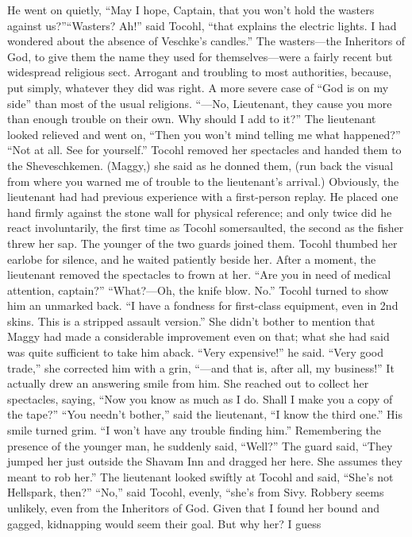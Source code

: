 \documentclass[9pt]{article}
\begin{document}
He went on quietly, “May I hope, Captain, that you won’t hold the wasters against us?”“Wasters? Ah!” said Tocohl, “that explains the electric lights. I had wondered about the absence of
Veschke’s candles.” The wasters—the Inheritors of God, to give them the name they used for
themselves—were a fairly recent but widespread religious sect. Arrogant and troubling to most
authorities, because, put simply, whatever they did was right. A more severe case of “God is on my side”
than most of the usual religions. “—No, Lieutenant, they cause you more than enough trouble on their
own. Why should I add to it?”
The lieutenant looked relieved and went on, “Then you won’t mind telling me what happened?”
“Not at all. See for yourself.” Tocohl removed her spectacles and handed them to the
Sheveschkemen. (Maggy,) she said as he donned them, (run back the visual from where you warned me
of trouble to the lieutenant’s arrival.)
Obviously, the lieutenant had had previous experience with a first-person replay. He placed one hand
firmly against the stone wall for physical reference; and only twice did he react involuntarily, the first time
as Tocohl somersaulted, the second as the fisher threw her sap.
The younger of the two guards joined them. Tocohl thumbed her earlobe for silence, and he waited
patiently beside her.
After a moment, the lieutenant removed the spectacles to frown at her. “Are you in need of medical
attention, captain?”
“What?—Oh, the knife blow. No.” Tocohl turned to show him an unmarked back. “I have a
fondness for first-class equipment, even in 2nd skins. This is a stripped assault version.” She didn’t
bother to mention that Maggy had made a considerable improvement even on that; what she had said
was quite sufficient to take him aback.
“Very expensive!” he said.
“Very good trade,” she corrected him with a grin, “—and that is, after all, my business!” It actually
drew an answering smile from him. She reached out to collect her spectacles, saying, “Now you know as
much as I do. Shall I make you a copy of the tape?”
“You needn’t bother,” said the lieutenant, “I know the third one.” His smile turned grim. “I won’t
have any trouble finding him.” Remembering the presence of the younger man, he suddenly said, “Well?”
The guard said, “They jumped her just outside the Shavam Inn and dragged her here. She assumes they
meant to rob her.”
The lieutenant looked swiftly at Tocohl and said, “She’s not Hellspark, then?”
“No,” said Tocohl, evenly, “she’s from Sivy. Robbery seems unlikely, even from the Inheritors of
God. Given that I found her bound and gagged, kidnapping would seem their goal. But why her? I guess
\end{document}

